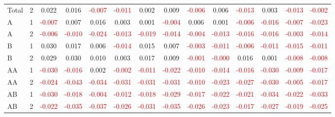\begin{table}[!htb]
{\begin{tabular}{llcccccccccccc}
Total & 2 & 0.022 & 0.016 & \textcolor{red}{-0.007} & \textcolor{red}{-0.011} & 0.002 & 0.009 & \textcolor{red}{-0.006} & 0.006 & \textcolor{red}{-0.013} & 0.003 & \textcolor{red}{-0.013} & \textcolor{red}{-0.002}\\
A & 1 & \textcolor{red}{-0.007} & 0.007 & 0.016 & 0.003 & 0.001 & \textcolor{red}{-0.004} & 0.006 & 0.001 & \textcolor{red}{-0.006} & \textcolor{red}{-0.016} & \textcolor{red}{-0.007} & \textcolor{red}{-0.023}\\
A & 2 & \textcolor{red}{-0.006} & \textcolor{red}{-0.010} & \textcolor{red}{-0.024} & \textcolor{red}{-0.013} & \textcolor{red}{-0.019} & \textcolor{red}{-0.014} & \textcolor{red}{-0.004} & \textcolor{red}{-0.013} & \textcolor{red}{-0.016} & \textcolor{red}{-0.016} & \textcolor{red}{-0.003} & \textcolor{red}{-0.014}\\
B & 1 & 0.030 & 0.017 & 0.006 & \textcolor{red}{-0.014} & 0.015 & 0.007 & \textcolor{red}{-0.003} & \textcolor{red}{-0.011} & \textcolor{red}{-0.006} & \textcolor{red}{-0.011} & \textcolor{red}{-0.015} & \textcolor{red}{-0.011}\\
B & 2 & 0.029 & 0.030 & 0.010 & 0.003 & 0.017 & 0.009 & \textcolor{red}{-0.001} & \textcolor{red}{-0.000} & 0.016 & 0.001 & \textcolor{red}{-0.008} & \textcolor{red}{-0.008}\\
AA & 1 & \textcolor{red}{-0.030} & \textcolor{red}{-0.016} & 0.002 & \textcolor{red}{-0.002} & \textcolor{red}{-0.011} & \textcolor{red}{-0.022} & \textcolor{red}{-0.010} & \textcolor{red}{-0.014} & \textcolor{red}{-0.016} & \textcolor{red}{-0.030} & \textcolor{red}{-0.009} & \textcolor{red}{-0.017}\\
AA & 2 & \textcolor{red}{-0.024} & \textcolor{red}{-0.043} & \textcolor{red}{-0.034} & \textcolor{red}{-0.031} & \textcolor{red}{-0.031} & \textcolor{red}{-0.031} & \textcolor{red}{-0.010} & \textcolor{red}{-0.023} & \textcolor{red}{-0.027} & \textcolor{red}{-0.030} & \textcolor{red}{-0.005} & \textcolor{red}{-0.017}\\
AB & 1 & \textcolor{red}{-0.030} & \textcolor{red}{-0.018} & \textcolor{red}{-0.004} & \textcolor{red}{-0.012} & \textcolor{red}{-0.018} & \textcolor{red}{-0.029} & \textcolor{red}{-0.017} & \textcolor{red}{-0.022} & \textcolor{red}{-0.021} & \textcolor{red}{-0.034} & \textcolor{red}{-0.022} & \textcolor{red}{-0.033}\\
AB & 2 & \textcolor{red}{-0.022} & \textcolor{red}{-0.035} & \textcolor{red}{-0.037} & \textcolor{red}{-0.026} & \textcolor{red}{-0.031} & \textcolor{red}{-0.035} & \textcolor{red}{-0.026} & \textcolor{red}{-0.023} & \textcolor{red}{-0.017} & \textcolor{red}{-0.027} & \textcolor{red}{-0.019} & \textcolor{red}{-0.025}\\

\end{tabular}}
\end{table}
